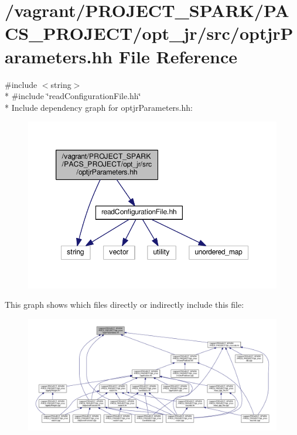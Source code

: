 \hypertarget{optjrParameters_8hh}{\section{/vagrant/\-P\-R\-O\-J\-E\-C\-T\-\_\-\-S\-P\-A\-R\-K/\-P\-A\-C\-S\-\_\-\-P\-R\-O\-J\-E\-C\-T/opt\-\_\-jr/src/optjr\-Parameters.hh File Reference}
\label{optjrParameters_8hh}
}
{\ttfamily \#include $<$string$>$}\\*
{\ttfamily \#include \char`\"{}read\-Configuration\-File.\-hh\char`\"{}}\\*
Include dependency graph for optjr\-Parameters.\-hh\-:\nopagebreak
\begin{figure}[H]
\begin{center}
\leavevmode
\includegraphics[width=349pt]{optjrParameters_8hh__incl}
\end{center}
\end{figure}
This graph shows which files directly or indirectly include this file\-:\nopagebreak
\begin{figure}[H]
\begin{center}
\leavevmode
\includegraphics[width=350pt]{optjrParameters_8hh__dep__incl}
\end{center}
\end{figure}
